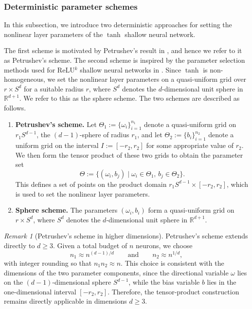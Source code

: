 \documentclass{article}
\theoremstyle{remark}
\newtheorem{remark}{Remark}
\begin{document}
\subsubsection{Deterministic parameter schemes }
In this subsection, we introduce two deterministic approaches for setting the nonlinear layer parameters of the $\tanh$ shallow neural network.

The first scheme is motivated by Petrushev’s result in \cite{petrushev1998approximation}, and hence we refer to it as Petrushev's scheme. 
The second scheme is inspired by the parameter selection methods used for ReLU$^k$ shallow neural networks in \cite{LMX2025}.
Since $\tanh$ is non-homogeneous, we set the nonlinear layer parameters on a quasi-uniform grid over $r \times S^d$ for a suitable radius $r$, where $S^d$ denotes the $d$-dimensional unit sphere in $\mathbb{R}^{d+1}$.
We refer to this as the sphere scheme.
The two schemes are described as follows.

\begin{enumerate}
    \item \textbf{Petrushev's scheme.}  
    Let $\Theta_1 := \{\omega_i \}_{i=1}^{n_1}$ denote a quasi-uniform grid on $r_1 S^{d-1}$, the $(d-1)$-sphere of radius $r_1$, and let $\Theta_2 := \{b_i\}_{i=1}^{n_2}$ denote a uniform grid on the interval $I := [-r_2, r_2]$ for some appropriate value of $r_2$.  
    We then form the tensor product of these two grids to obtain the parameter set  
    \[
    \Theta := \{ (\omega_i, b_j) \mid \omega_i \in \Theta_1,\, b_j \in \Theta_2 \}.
    \]
    This defines a set of points on the product domain $r_1 S^{d-1} \times [-r_2,r_2]$, which is used to set the nonlinear layer parameters.  
    \item \textbf{Sphere scheme.}  
    The parameters $(\omega_i, b_i)$ form a quasi-uniform grid on $r \times S^d$, where $S^d$ denotes the $d$-dimensional unit sphere in $\mathbb{R}^{d+1}$.  
\end{enumerate}

{\color{blue}
\begin{remark}[Petrushev's scheme in higher dimensions]
Petrushev's scheme extends directly to $d\geq 3$. Given a total budget of $n$ neurons, we choose
\[
n_1 \approx n^{(d-1)/d}
\qquad\text{and}\qquad
n_2 \approx n^{1/d},
\]
with integer rounding so that $n_1n_2\approx n$. 
This choice is consistent with the dimensions of the two parameter components, since the directional variable $\omega$ lies on the $(d-1)$-dimensional sphere $S^{d-1}$, while the bias variable $b$ lies in the one-dimensional interval $[-r_2,r_2]$. 
Therefore, the tensor-product construction remains directly applicable in dimensions $d\geq 3$.
\end{remark}
}
\end{document}
